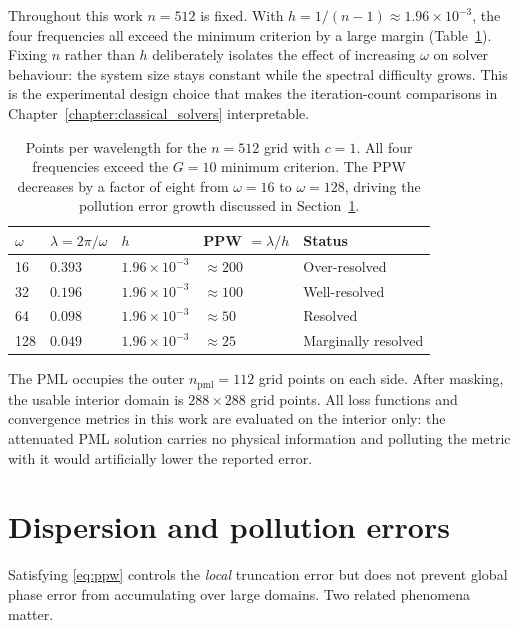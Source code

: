 Throughout this work $n = 512$ is fixed. With $h = 1/(n-1)
\approx 1.96 \times 10^{-3}$, the four frequencies all exceed
the minimum criterion by a large margin
(Table~\ref{tab:resolution}). Fixing $n$ rather than $h$
deliberately isolates the effect of increasing $\omega$ on solver
behaviour: the system size stays constant while the spectral
difficulty grows. This is the experimental design choice that
makes the iteration-count comparisons in
Chapter~\ref{chapter:classical_solvers} interpretable.

\begin{table}[h]
\centering
\begin{tabular}{lllll}
\toprule
$\omega$ & $\lambda = 2\pi/\omega$ & $h$ &
PPW $= \lambda/h$ & Status \\
\midrule
16  & $0.393$ & $1.96 \times 10^{-3}$ & $\approx 200$ & Over-resolved \\
32  & $0.196$ & $1.96 \times 10^{-3}$ & $\approx 100$ & Well-resolved \\
64  & $0.098$ & $1.96 \times 10^{-3}$ & $\approx 50$  & Resolved \\
128 & $0.049$ & $1.96 \times 10^{-3}$ & $\approx 25$  & Marginally resolved \\
\bottomrule
\end{tabular}
\caption{Points per wavelength for the $n = 512$ grid with
$c = 1$. All four frequencies exceed the $G = 10$ minimum
criterion. The PPW decreases by a factor of eight from $\omega = 16$
to $\omega = 128$, driving the pollution error growth discussed
in Section~\ref{sec:dispersion_pollution}.}
\label{tab:resolution}
\end{table}

The PML occupies the outer $n_{\mathrm{pml}} = 112$ grid points
on each side. After masking, the usable interior domain is
$288 \times 288$ grid points. All loss functions and convergence
metrics in this work are evaluated on the interior only: the
attenuated PML solution carries no physical information and
polluting the metric with it would artificially lower the
reported error.


\section{Dispersion and pollution errors}
\label{sec:dispersion_pollution}

Satisfying \eqref{eq:ppw} controls the \emph{local} truncation
error but does not prevent global phase error from accumulating
over large domains. Two related phenomena matter.

